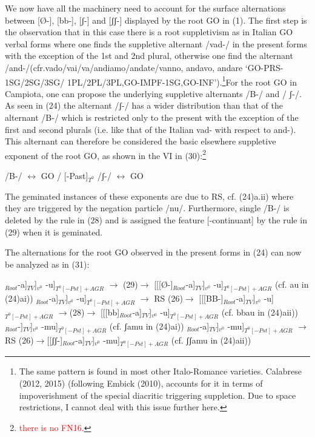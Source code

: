 \documentclass[output=paper,colorlinks,citecolor=brown,
]{langscibook}
\begin{document}
We now have all the machinery need to account for the surface alternations between [Ø-], [bb-], [ʃ-]  and [ʃʃ-]  displayed by the root GO in (1).   The first step is the observation that in this case there is a root suppletivism as in Italian GO verbal forms where one finds the suppletive alternant /vad-/ in the present forms with the exception of the 1st and 2nd plural, otherwise one find the alternant /and-/(cfr.vado/vai/va/andiamo/andate/vanno,  andavo,  andare ‘GO-PRS-1SG/2SG/3SG/ 1PL/2PL/3PL,GO-IMPF-1SG,GO-INF’).\footnote{
The same pattern is found in most other Italo-Romance varieties.  Calabrese (2012, 2015) (following Embick (2010), accounts for it in terms of impoverishment of the special diacritic triggering suppletion. Due to space restrictions, I cannot deal with this issue further here.}For the root GO in Campiota, one can propose the underlying suppletive alternants  /B-/  and  /  ʃ-/. As seen in  (24)  the alternant  /ʃ-/  has a wider distribution than that of the alternant  /B-/ which is restricted only to the present with the exception of the first and second plurals (i.e. like that of the Italian  vad- with respect to  and-).  This alternant can therefore be considered the basic elsewhere suppletive exponent of the root GO, as shown in the VI in (30):\footnote{\textcolor{red}{there is no FN16.}}

\ea
    \ea /B-/ $\longleftrightarrow$ GO / \underline{\hspace{2em}}  [-Past]$_{T^0}$
    \ex /ʃ-/ $\longleftrightarrow$ GO
    \z
\z

The geminated instances of these exponents are due to RS, cf. (24)a.ii) where they are triggered by the negation particle /nu/. Furthermore, single /B-/ is deleted by the rule in (28) and is assigned the feature [-continuant] by the rule in (29) when it is geminated.

The alternations for the root GO observed in the present forms in (24) can now be analyzed as in (31):

\ea
    \ea {[[[B-]}$_{Root}$-a]$_{TV}$]$_{v^0}$ -u]$_{T^0 [-Pst]+AGR}$ $\rightarrow$ (29)$\rightarrow$ [[[Ø-]$_{Root}$-a]$_{TV}$]$_{v^0}$ -u]$_{T^0 [-Pst]+AGR}$        (cf. au in (24)ai))
    \ex {[[[B-]}$_{Root}$-a]$_{TV}$]$_{v^0}$ -u]$_{T^0 [-Pst]+AGR}$ $\rightarrow$ RS (26)$\rightarrow$ [[[BB-]$_{Root}$-a]$_{TV}$]$_{v^0}$ -u]$_{T^0 [-Pst]+AGR}$      $\rightarrow$(28)$\rightarrow$ [[[bb]$_{Root}$-a]$_{TV}$]$_{v^0}$ -u]$_{T^0 [-Pst]+AGR}$   (cf. bbau in (24)aii)) 
    \ex {[[[ʃ -]}$_{Root}$-]$_{TV}$]$_{v^0}$ -mu]$_{T^0 [-Pst]+AGR}$ (cf. ʃamu in (24)ai))
    \ex {[[[ʃ-]}$_{Root}$-a]$_{TV}$]$_{v^0}$ -mu]$_{T^0 [-Pst]+AGR}$ $\rightarrow$RS (26)$\rightarrow$[[ʃʃ-]$_{Root}$-a]$_{TV}$]$_{v^0}$ -mu]$_{T^0 [-Pst]+AGR}$           (cf. ʃʃamu in (24)aii))
    \z
\z
\end{document}

